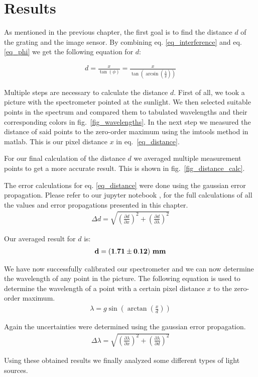 \section{Results}\label{sec_results}

As mentioned in the previous chapter, the first goal is to find the distance $d$ of the grating
and the image sensor.
By combining eq. \ref{eq_interference} and eq. \ref{eq_phi} we get the following equation for $d$:

\begin{align}
    d = \frac{x}{\tan(\phi)} = \frac{x}{\tan(\arcsin(\frac{\lambda}{g}))} \label{eq_distance}
\end{align}

Multiple steps are necessary to calculate the distance $d$.
First of all, we took a picture with the spectrometer pointed at the sunlight. We then selected suitable 
points in the spectrum and compared them to tabulated wavelengths and their corresponding colors 
in fig.~\ref{fig_wavelengths}. In the next step we measured the distance of said points to the zero-order maximum
using the imtools method in matlab. This is our pixel distance $x$ in eq.~\ref{eq_distance}.

For our final calculation of the distance $d$ we averaged multiple measurement points to get a more
accurate result. This is shown in fig.~\ref{fig_distance_calc}.

The error calculations for eq. \ref{eq_distance} were done using the gaussian error propagation.
Please refer to our jupyter notebook \cite{GitHub}, for the full calculations of all the values and 
error propagations presented in this chapter. 
\begin{align}
    \Delta d = \sqrt{\left(\frac{\partial d}{\partial x}\right)^2 + \left(\frac{\partial d}{\partial \lambda}\right)^2}
\end{align}

Our averaged result for $d$ is:
\begin{align}
    \bf d = (1.71 \pm 0.12) ~\si{\bf\milli\meter} \label{res_d}
\end{align}

We have now successfully calibrated our spectrometer and we can now determine the wavelength
of any point in the picture.
The following equation is used to determine the wavelength of a point with a certain pixel 
distance $x$ to the zero-order maximum.
\begin{align}
    \lambda = g \sin\left(\arctan\left(\frac{x}{d}\right)\right) \label{eq_lambda}
\end{align}

Again the uncertainties were determined using the gaussian error propagation.
\begin{align}
    \Delta \lambda = \sqrt{\left(\frac{\partial \lambda}{\partial x}\right)^2 + \left(\frac{\partial \lambda}{\partial d}\right)^2}
\end{align}

Using these obtained results we finally analyzed some different types of light
sources.